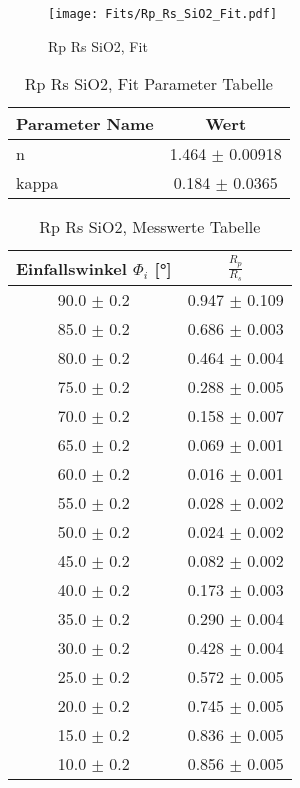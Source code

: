 \begin{figure}[ht] 
 	\centering 
 	\texttt{[image: Fits/Rp\_Rs\_SiO2\_Fit.pdf]} 
	\caption{Rp Rs SiO2, Fit} 
 	\label{fig:Rp Rs SiO2, Fit} 
\end{figure}
 
\begin{table}[ht] 
	\centering 
	\caption{Rp Rs SiO2, Fit Parameter Tabelle} 
	\label{tab: Rp Rs SiO2, Fit Parameter Tabelle}
	\begin{tabular}{|l|c|}
		\hline
		Parameter Name	&	Wert \\ \hline
		n	&	 1.464 $\pm$  0.00918\\ \hline
		kappa	&	 0.184 $\pm$  0.0365\\ \hline
	\end{tabular} 
\end{table}
 
\begin{table}[ht] 
	\centering 
	\caption{Rp Rs SiO2, Messwerte Tabelle} 
	\label{tab: Rp Rs SiO2, Messwerte Tabelle}
	\begin{tabular}{|c|c|}
		\hline
		Einfallswinkel $\Phi_i$ [°] 	&	 $\frac{R_p}{R_s}$\\ \hline
		90.0 $\pm$ 0.2 	&	 0.947 $\pm$ 0.109 \\ \hline
		85.0 $\pm$ 0.2 	&	 0.686 $\pm$ 0.003 \\ \hline
		80.0 $\pm$ 0.2 	&	 0.464 $\pm$ 0.004 \\ \hline
		75.0 $\pm$ 0.2 	&	 0.288 $\pm$ 0.005 \\ \hline
		70.0 $\pm$ 0.2 	&	 0.158 $\pm$ 0.007 \\ \hline
		65.0 $\pm$ 0.2 	&	 0.069 $\pm$ 0.001 \\ \hline
		60.0 $\pm$ 0.2 	&	 0.016 $\pm$ 0.001 \\ \hline
		55.0 $\pm$ 0.2 	&	 0.028 $\pm$ 0.002 \\ \hline
		50.0 $\pm$ 0.2 	&	 0.024 $\pm$ 0.002 \\ \hline
		45.0 $\pm$ 0.2 	&	 0.082 $\pm$ 0.002 \\ \hline
		40.0 $\pm$ 0.2 	&	 0.173 $\pm$ 0.003 \\ \hline
		35.0 $\pm$ 0.2 	&	 0.290 $\pm$ 0.004 \\ \hline
		30.0 $\pm$ 0.2 	&	 0.428 $\pm$ 0.004 \\ \hline
		25.0 $\pm$ 0.2 	&	 0.572 $\pm$ 0.005 \\ \hline
		20.0 $\pm$ 0.2 	&	 0.745 $\pm$ 0.005 \\ \hline
		15.0 $\pm$ 0.2 	&	 0.836 $\pm$ 0.005 \\ \hline
		10.0 $\pm$ 0.2 	&	 0.856 $\pm$ 0.005 \\ \hline
	\end{tabular} 
\end{table}
 
